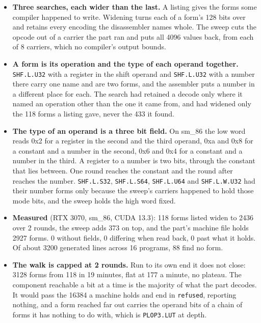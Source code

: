 \begin{enumerate}
\begin{itemize}
\item \textbf{Three searches, each wider than the last.} A listing gives the forms some compiler happened to write. Widening turns each of a form's 128 bits over and retains every encoding the disassembler names whole. The sweep cuts the opcode out of a carrier the part ran and puts all 4096 values back, from each of 8 carriers, which no compiler's output bounds.
\item \textbf{A form is its operation and the type of each operand together.} \texttt{SHF.\allowbreak{}L.\allowbreak{}U32} with a register in the shift operand and \texttt{SHF.\allowbreak{}L.\allowbreak{}U32} with a number there carry one name and are two forms, and the assembler puts a number in a different place for each. The search had retained a decode only where it named an operation other than the one it came from, and had widened only the 118 forms a listing gave, never the 433 it found.
\item \textbf{The type of an operand is a three bit field.} On sm\_\allowbreak{}86 the low word reads 0x2 for a register in the second and the third operand, 0xa and 0x8 for a constant and a number in the second, 0x6 and 0x4 for a constant and a number in the third. A register to a number is two bits, through the constant that lies between. One round reaches the constant and the round after reaches the number. \texttt{SHF.\allowbreak{}L.\allowbreak{}S32}, \texttt{SHF.\allowbreak{}L.\allowbreak{}S64}, \texttt{SHF.\allowbreak{}L.\allowbreak{}U64} and \texttt{SHF.\allowbreak{}L.\allowbreak{}W.\allowbreak{}U32} had their number forms only because the sweep's carriers happened to hold those mode bits, and the sweep holds the high word fixed.
\item \textbf{Measured} (RTX 3070, sm\_\allowbreak{}86, CUDA 13.3): 118 forms listed widen to 2436 over 2 rounds, the sweep adds 373 on top, and the part's machine file holds 2927 forms. 0 without fields, 0 differing when read back, 0 past what it holds. Of about 3200 generated lines across 16 programs, 88 find no form.
\item \textbf{The walk is capped at 2 rounds.} Run to its own end it does not close: 3128 forms from 118 in 19 minutes, flat at 177 a minute, no plateau. The component reachable a bit at a time is the majority of what the part decodes. It would pass the 16384 a machine holds and end in \texttt{refused}, reporting nothing, and a form reached far out carries the operand bits of a chain of forms it has nothing to do with, which is \texttt{PLOP3.\allowbreak{}LUT} at depth.

\end{itemize}
\end{enumerate}
